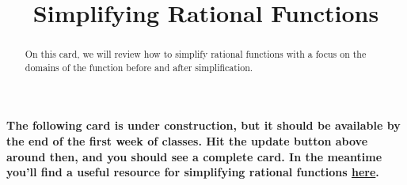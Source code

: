 \documentclass{ximera}
\title[Dig-In:]{Simplifying Rational Functions}
\begin{document}
\begin{abstract}
On this card, we will review how to simplify rational functions with a focus on the domains of the function before and after simplification. 
\end{abstract}
\maketitle

\textbf{The following card is under construction, but it should be available by the end of the first week of classes.  Hit the update button above around then, and you should see a complete card.  In the meantime you'll find a useful resource for simplifying rational functions \href{https://www.khanacademy.org/math/algebra2/rational-expressions-equations-and-functions/simplify-rational-expressions/a/intro-to-rational-expressions}{here}.}
\end{document}
